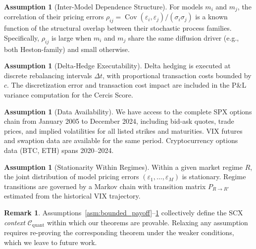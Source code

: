 \documentclass[11pt,a4paper]{article}
\theoremstyle{plain}
\theoremstyle{definition}
\newtheorem{assumption}[theorem]{Assumption}
\newtheorem{remark}[theorem]{Remark}
\theoremstyle{remark}
\newcommand{\Cov}{\operatorname{Cov}}
\newcommand{\SCX}{\textsc{SCX}}
\begin{document}
\begin{assumption}[Inter-Model Dependence Structure]\label{asm:inter_model}
For models $m_i$ and $m_j$, the correlation of their pricing errors $\rho_{ij} = \Cov(\varepsilon_i, \varepsilon_j) / (\sigma_i \sigma_j)$ is a known function of the structural overlap between their stochastic process families. Specifically, $\rho_{ij}$ is large when $m_i$ and $m_j$ share the same diffusion driver (e.g., both Heston-family) and small otherwise.
\end{assumption}

\begin{assumption}[Delta-Hedge Executability]\label{asm:delta_hedge}
Delta hedging is executed at discrete rebalancing intervals $\Delta t$, with proportional transaction costs bounded by $c$. The discretization error and transaction cost impact are included in the P\&L variance computation for the Cercis Score.
\end{assumption}

\begin{assumption}[Data Availability]\label{asm:data}
We have access to the complete SPX options chain from January 2005 to December 2024, including bid-ask quotes, trade prices, and implied volatilities for all listed strikes and maturities. VIX futures and swaption data are available for the same period. Cryptocurrency options data (BTC, ETH) spans 2020--2024.
\end{assumption}

\begin{assumption}[Stationarity Within Regimes]\label{asm:stationarity}
Within a given market regime $R$, the joint distribution of model pricing errors $(\varepsilon_1, \dots, \varepsilon_M)$ is stationary. Regime transitions are governed by a Markov chain with transition matrix $P_{R \to R'}$ estimated from the historical VIX trajectory.
\end{assumption}

\begin{remark}
Assumptions~\ref{asm:bounded_payoff}--\ref{asm:stationarity} collectively define the \SCX{} \emph{context} $\mathcal{C}_{\text{quant}}$ within which our theorems are provable. Relaxing any assumption requires re-proving the corresponding theorem under the weaker conditions, which we leave to future work.
\end{remark}

\end{document}
